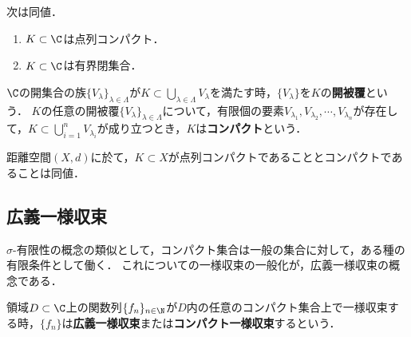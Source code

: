 \documentclass[uplatex, dvipdfmx]{jsreport}
\begin{document}
\begin{theorem}[Weierstrass]\label{thm-Weierstrass}
    次は同値．
    \begin{enumerate}
        \item $K\subset\C$は点列コンパクト．
        \item $K\subset\C$は有界閉集合．
    \end{enumerate}
\end{theorem}

\begin{definition}[compact]
    $\C$の開集合の族$\{V_\lambda\}_{\lambda\in\Lambda}$が$K\subset\bigcup_{\lambda\in\Lambda}V_\lambda$を満たす時，$\{V_\lambda\}$を$K$の\textbf{開被覆}という．
    $K$の任意の開被覆$\{V_\lambda\}_{\lambda\in\Lambda}$について，有限個の要素$V_{\lambda_1},V_{\lambda_2},\cdots,V_{\lambda_n}$が存在して，$K\subset\bigcup_{i=1}^nV_{\lambda_i}$が成り立つとき，$K$は\textbf{コンパクト}という．
\end{definition}

\begin{theorem}\label{thm-sequantial-compactness-and-compactness}
    距離空間$(X,d)$に於て，$K\subset X$が点列コンパクトであることとコンパクトであることは同値．
\end{theorem}

\subsection{広義一様収束}

\begin{tcolorbox}[colframe=ForestGreen, colback=ForestGreen!10!white,breakable,colbacktitle=ForestGreen!40!white,coltitle=black,fonttitle=\bfseries\sffamily,
title=]
    $\sigma$-有限性の概念の類似として，コンパクト集合は一般の集合に対して，ある種の有限条件として働く．
    これについての一様収束の一般化が，広義一様収束の概念である．
\end{tcolorbox}

\begin{definition}
    領域$D\subset\C$上の関数列$\{f_n\}_{n\in\N}$が$D$内の任意のコンパクト集合上で一様収束する時，$\{f_n\}$は\textbf{広義一様収束}または\textbf{コンパクト一様収束}するという．
\end{definition}
\end{document}
